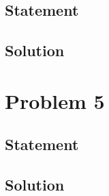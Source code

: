 \documentclass[a4paper]{article}
\begin{document}
\subsection{Statement}
\subsection{Solution}

\newpage

\section{Problem 5}

\subsection{Statement}
\subsection{Solution}
\end{document}
